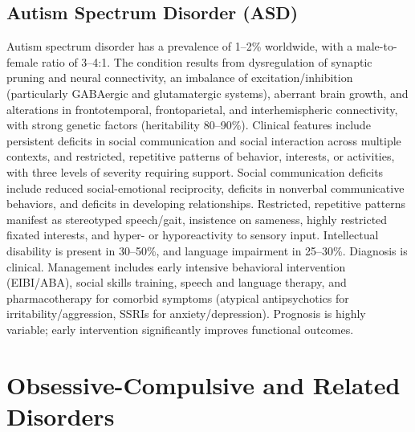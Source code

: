 \subsection{Autism Spectrum Disorder (ASD)}
\label{sec:Autism Spectrum Disorder (ASD)}
Autism spectrum disorder has a prevalence of 1--2\% worldwide, with a male-to-female ratio of 3--4:1. The condition results from dysregulation of synaptic pruning and neural connectivity, an imbalance of excitation/inhibition (particularly GABAergic and glutamatergic systems), aberrant brain growth, and alterations in frontotemporal, frontoparietal, and interhemispheric connectivity, with strong genetic factors (heritability 80--90\%). Clinical features include persistent deficits in social communication and social interaction across multiple contexts, and restricted, repetitive patterns of behavior, interests, or activities, with three levels of severity requiring support. Social communication deficits include reduced social-emotional reciprocity, deficits in nonverbal communicative behaviors, and deficits in developing relationships. Restricted, repetitive patterns manifest as stereotyped speech/gait, insistence on sameness, highly restricted fixated interests, and hyper- or hyporeactivity to sensory input. Intellectual disability is present in 30--50\%, and language impairment in 25--30\%. Diagnosis is clinical. Management includes early intensive behavioral intervention (EIBI/ABA), social skills training, speech and language therapy, and pharmacotherapy for comorbid symptoms (atypical antipsychotics for irritability/aggression, SSRIs for anxiety/depression). Prognosis is highly variable; early intervention significantly improves functional outcomes.

\section{Obsessive-Compulsive and Related Disorders}





